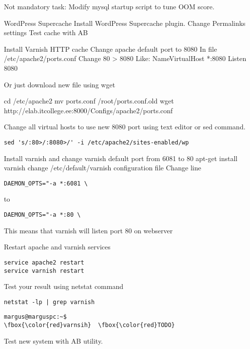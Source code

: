Not mandatory task: Modify mysql startup script to tune OOM score. 

WordPress Supercache
Install WordPress Supercache plugin.
Change Permalinks settings
Test cache with AB

Install Varnish HTTP cache
Change apache default port to 8080
In file /etc/apache2/ports.conf
Change 80 > 8080
Like:
NameVirtualHost *:8080
Listen 8080

Or just download new file using wget 

cd /etc/apache2
mv ports.conf /root/ports.conf.old
wget http://elab.itcollege.ee:8000/Configs/apache2/ports.conf

Change all virtual hosts to use new 8080 port using text editor or sed command.

\begin{verbatim}
sed 's/:80>/:8080>/' -i /etc/apache2/sites-enabled/wp
\end{verbatim}


Install varnish and change varnish default port from 6081 to 80
apt-get install varnish
change /etc/default/varnish configuration file
Change line
\begin{verbatim}
DAEMON_OPTS="-a *:6081 \ 
\end{verbatim}
to
\begin{verbatim}
DAEMON_OPTS="-a *:80 \
\end{verbatim}

This means that varnish will listen port 80 on webserver

Restart apache and varnish services
\begin{verbatim}
service apache2 restart
service varnish restart
\end{verbatim}
Test your result using netstat command

\begin{verbatim}
netstat -lp | grep varnish
\end{verbatim}


\begin{Verbatim}[frame=single,
label=Command output,framesep=2mm,rulecolor=\color{red},commandchars=\\\{\}]
margus@marguspc:~$ 
\fbox{\color{red}varnsih}  \fbox{\color{red}TODO}
\end{Verbatim}


Test new system with AB utility.

